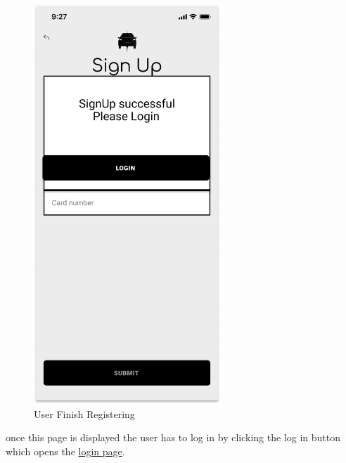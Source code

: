 \begin{figure}[H]
    \centering
    \includegraphics[keepaspectratio, height=15cm]{Mockup/UserAppInterface/Registration Succesful.png}
    \caption{User Finish Registering}
    \label{fig:ConfirmReg}
\end{figure}
once this page is displayed the user has to log in by clicking the log in button which opens the \hyperref[fig:Login]{login page}.
